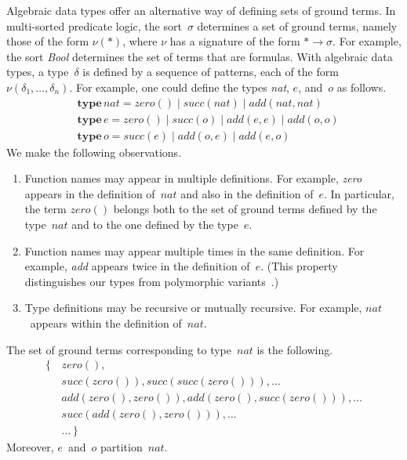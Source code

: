 \documentclass[a4paper,12pt,oneside,fleqn]{book} %
\newcommand{\rg}[1]{\marginpar{\tiny\raggedright\textcolor{blue}{\bf rg:} #1}}
\renewcommand{\rg}{}
\begin{document}
{Algebraic data types offer an alternative way of defining sets of ground
terms. In multi-sorted predicate logic, the sort~$\sigma$ determines a set
of ground terms, namely those of the form $\nu(*)$, where $\nu$ has a
signature of the form $*\to\sigma$.  For example, the sort \textit{Bool}
determines the set of terms that are formulas.  With algebraic data types,
a type~$\delta$ is defined by a sequence of patterns, each of the form
$\nu(\delta_1,\ldots,\delta_n)$. For example, one could define the types
\textit{nat}, $e$, and~$o$ as follows.
\begin{align}
&\mathbf{type}\,\mathit{nat} =
      \mathit{zero}()
  \mid\mathit{succ}(\mathit{nat})
  \mid\mathit{add}(\mathit{nat},\mathit{nat}) \\
&\mathbf{type}\,e =
      \mathit{zero}()
  \mid\mathit{succ}(o)
  \mid\mathit{add}(e,e)
  \mid\mathit{add}(o,o) \\
&\mathbf{type}\,o =
      \mathit{succ}(e)
  \mid\mathit{add}(o,e)
  \mid\mathit{add}(e,o)
\end{align}
We make the following observations.
\begin{enumerate}
\item
  Function names may appear in multiple definitions. For example,
  \textit{zero} appears in the definition of~$\mathit{nat}$ and also in the
  definition of~$e$. In particular, the term $\mathit{zero}()$ belongs both
  to the set of ground terms defined by the type~$\mathit{nat}$ and to the
  one defined by the type~$e$.
\item
  Function names may appear multiple times in the same definition. For
  example, \textit{add} appears twice in the definition of~$e$. (This
  property distinguishes our types from polymorphic
  variants~\cite{garrigue1998}.)
\item
  Type definitions may be recursive or mutually recursive. For example,
  $\mathit{nat}$~appears within the definition of~$\mathit{nat}$.
\end{enumerate}
The set of ground terms corresponding to type~$\mathit{nat}$ is the following.
\begin{equation}
\begin{aligned}
\{\,&\mathit{zero}(), \\
    &\mathit{succ}(\mathit{zero}()),
        \mathit{succ}(\mathit{succ}(\mathit{zero}())), \ldots \\
    &\mathit{add}(\mathit{zero}(), \mathit{zero}()),
        \mathit{add}(\mathit{zero}(), \mathit{succ}(\mathit{zero}())),
        \ldots \\
    &\mathit{succ}(\mathit{add}(\mathit{zero}(), \mathit{zero}())),
        \ldots \\
    &\ldots\, \}
\end{aligned}
\end{equation}
Moreover, $e$~and~$o$ partition~$\mathit{nat}$.

}
\end{document}
